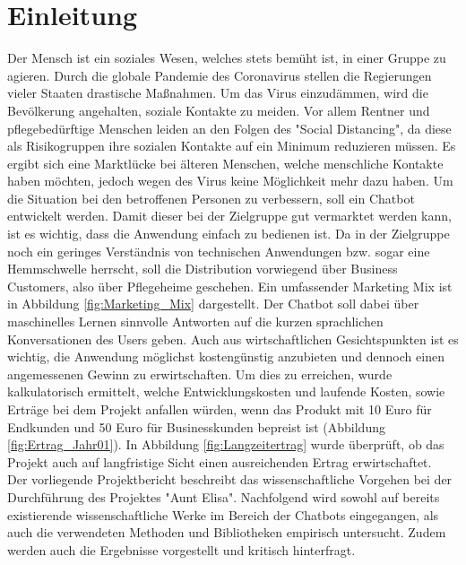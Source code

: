 \documentclass{aa}
\begin{document}
\section{Einleitung}
     Der Mensch ist ein soziales Wesen, welches stets bemüht ist, in einer Gruppe zu agieren. Durch die globale Pandemie des Coronavirus stellen die Regierungen vieler Staaten drastische Maßnahmen. Um das Virus einzudämmen,  wird die Bevölkerung angehalten, soziale Kontakte zu meiden. Vor allem Rentner und pflegebedürftige Menschen leiden an den Folgen des "Social Distancing", da diese als Risikogruppen ihre sozialen Kontakte auf ein Minimum reduzieren müssen. Es ergibt sich eine Marktlücke bei älteren Menschen, welche menschliche Kontakte haben möchten, jedoch wegen des Virus keine Möglichkeit mehr dazu haben. Um die Situation bei den betroffenen Personen zu verbessern, soll ein Chatbot entwickelt werden. Damit dieser bei der Zielgruppe gut vermarktet werden kann, ist es wichtig, dass die Anwendung einfach zu bedienen ist. Da in der Zielgruppe noch ein geringes Verständnis von technischen Anwendungen bzw. sogar eine Hemmschwelle herrscht, soll die Distribution vorwiegend über Business Customers, also über Pflegeheime geschehen. Ein umfassender Marketing Mix ist in Abbildung \ref{fig:Marketing_Mix} dargestellt. Der Chatbot soll dabei über maschinelles Lernen sinnvolle Antworten auf die kurzen sprachlichen Konversationen des Users geben. Auch aus wirtschaftlichen Gesichtspunkten ist es wichtig, die Anwendung möglichst kostengünstig anzubieten und dennoch einen angemessenen Gewinn zu erwirtschaften. Um dies zu erreichen, wurde kalkulatorisch ermittelt, welche Entwicklungskosten und laufende Kosten, sowie Erträge bei dem Projekt anfallen würden, wenn das Produkt mit 10 Euro für Endkunden und 50 Euro für Businesskunden bepreist ist (Abbildung \ref{fig:Ertrag_Jahr01}). In Abbildung \ref{fig:Langzeitertrag} wurde überprüft, ob das Projekt auch auf langfristige Sicht einen ausreichenden Ertrag erwirtschaftet.\\
      Der vorliegende Projektbericht beschreibt das wissenschaftliche Vorgehen bei der Durchführung des Projektes "Aunt Elisa". Nachfolgend wird sowohl auf bereits existierende wissenschaftliche Werke im Bereich der Chatbots eingegangen, als auch die verwendeten Methoden und Bibliotheken empirisch untersucht. Zudem werden auch die Ergebnisse vorgestellt und kritisch hinterfragt.
       
\end{document}
